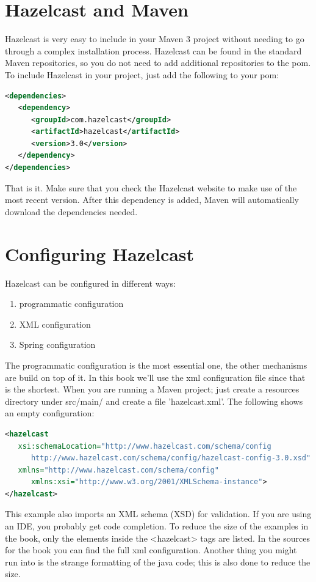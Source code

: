 \section{Hazelcast and Maven}
Hazelcast is very easy to include in your Maven 3 project without needing to go through a complex installation process. Hazelcast can be found in the standard Maven repositories, so you do not need to add additional repositories to the pom. To include Hazelcast in your project, just add the following to your pom:
\begin{lstlisting}[language=xml]
<dependencies>	
   <dependency>
      <groupId>com.hazelcast</groupId>
      <artifactId>hazelcast</artifactId>
      <version>3.0</version>
   </dependency>
</dependencies>
\end{lstlisting}
That is it. Make sure that you check the Hazelcast website to make use of the most recent version. After this dependency is added, Maven will automatically download the dependencies needed.

\section{Configuring Hazelcast}
Hazelcast can be configured in different ways:
\begin{enumerate}
\item programmatic configuration
\item XML configuration 
\item Spring configuration
\end{enumerate}
The programmatic configuration is the most essential one, the other mechanisms are build on top of it. In this book we'll use the xml configuration file since that is the shortest. When you are running a Maven project; just create a resources directory under src/main/ and create a file 'hazelcast.xml'. The following shows an empty configuration:
\begin{lstlisting}[language=xml]
<hazelcast 
   xsi:schemaLocation="http://www.hazelcast.com/schema/config                               
      http://www.hazelcast.com/schema/config/hazelcast-config-3.0.xsd"
   xmlns="http://www.hazelcast.com/schema/config"
      xmlns:xsi="http://www.w3.org/2001/XMLSchema-instance">
</hazelcast>
\end{lstlisting}
This example also imports an XML schema (XSD) for validation. If you are using an IDE, you probably get code completion. To reduce the size of the examples in the book, only the elements inside the <hazelcast> tags are listed. In the sources for the book you can find the full xml configuration. Another thing you might run into is the strange formatting of the java code; this is also done to reduce the size. 


